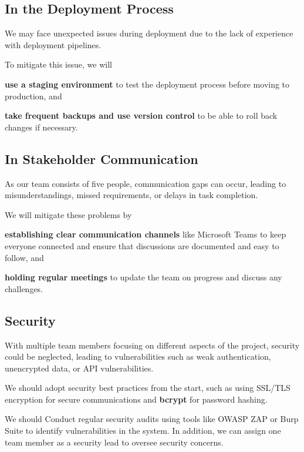\documentclass[a4paper,journal]{IEEEtran}
\begin{document}
\subsection{In the Deployment Process}
We may face unexpected issues during deployment due to the lack of experience
with deployment pipelines.

To mitigate this issue, we will
\begin{enumerate*}
  \item \textbf{use a staging environment} to test the deployment process before
    moving to production, and
  \item \textbf{take frequent backups and use version control} to be able to
    roll back changes if necessary.
\end{enumerate*}

\subsection{In Stakeholder Communication}
As our team consists of five people, communication gaps can occur, leading to
misunderstandings, missed requirements, or delays in task completion.

We will mitigate these problems by
\begin{enumerate*}
  \item \textbf{establishing clear communication channels}
    like Microsoft Teams to keep everyone connected and ensure that discussions
    are documented and easy to follow, and
  \item \textbf{holding regular meetings}
    to update the team on progress and discuss any challenges.
\end{enumerate*}

\subsection{Security}
With multiple team members focusing on different aspects of the project,
security could be neglected, leading to vulnerabilities such as weak
authentication, unencrypted data, or API vulnerabilities.

We should adopt security best practices from the start, such as using SSL/TLS
encryption for secure communications and \textbf{bcrypt} for password hashing.

We should Conduct regular security audits using tools like OWASP ZAP or Burp
Suite to identify vulnerabilities in the system.
In addition, we can assign one team member as a security lead to oversee
security concerns.
\end{document}

